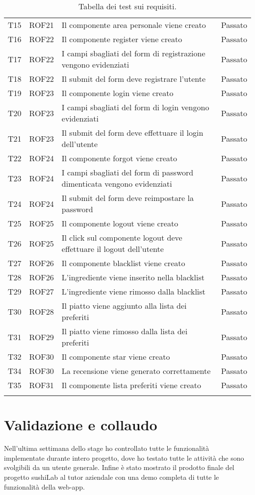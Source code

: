 \begin{center}
\begin{longtable}{ |p{1cm}|p{1.5cm}|p{9cm}|p{1.5cm}|  }
        T15&ROF21&Il componente area personale viene creato&Passato\\
        T16&ROF22&Il componente register viene creato&Passato\\
        T17&ROF22&I campi sbagliati del form di registrazione vengono evidenziati&Passato\\
        T18&ROF22&Il submit del form deve registrare l'utente&Passato\\
        T19&ROF23&Il componente login viene creato&Passato\\
        T20&ROF23&I campi sbagliati del form di login vengono evidenziati &Passato\\
        T21&ROF23&Il submit del form deve effettuare il login dell'utente &Passato\\
        T22&ROF24&Il componente forgot viene creato  &Passato\\
        T23&ROF24&I campi sbagliati del form di password dimenticata vengono evidenziati &Passato\\
        T24&ROF24&Il submit del form deve reimpostare la password&Passato\\
        T25&ROF25&Il componente logout viene creato&Passato\\
        T26&ROF25&Il click sul componente logout deve effettuare il logout dell'utente&Passato\\
        T27&ROF26&Il componente blacklist viene creato&Passato\\
        T28&ROF26&L'ingrediente viene inserito nella blacklist&Passato\\
        T29&ROF27&L'ingrediente viene rimosso dalla blacklist&Passato\\
        T30&ROF28&Il piatto viene aggiunto alla lista dei preferiti&Passato\\
        T31&ROF29&Il piatto viene rimosso dalla lista dei preferiti&Passato\\
        T32&ROF30&Il componente star viene creato&Passato\\
        T34&ROF30&La recensione viene generato correttamente&Passato\\
        T35&ROF31&Il componente lista preferiti viene creato&Passato\\
\hline
\caption{\label{tab:tabella dei test sui requisiti}Tabella dei test sui requisiti.}
\end{longtable}
\end{center}
\section{Validazione e collaudo}
Nell'ultima settimana dello stage ho controllato tutte le funzionalità implementate durante intero progetto, dove ho testato tutte le attività che sono svolgibili da un utente generale. Infine è stato mostrato il prodotto finale del progetto sushiLab al tutor aziendale con una demo completa di tutte le funzionalità della web-app.